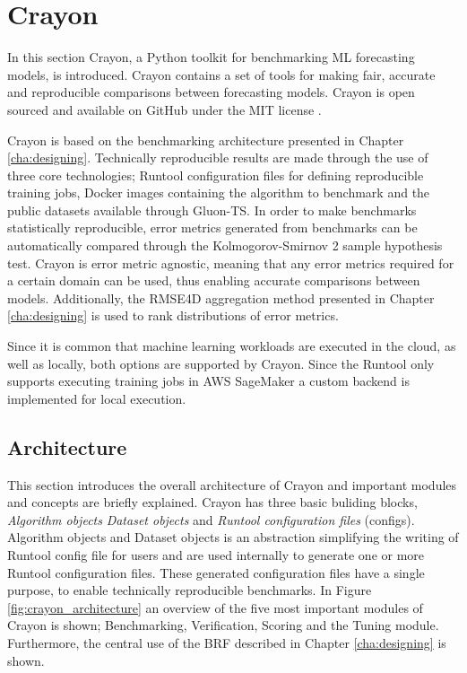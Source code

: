\chapter{Crayon}
\label{cha:crayon}

In this section Crayon, a Python toolkit for benchmarking ML forecasting models, is introduced. Crayon contains a set of tools for making fair, accurate and reproducible comparisons between forecasting models. Crayon is open sourced and available on GitHub under the MIT license \cite{crayon_github}.

Crayon is based on the benchmarking architecture presented in Chapter \ref{cha:designing}. Technically reproducible results are made through the use of three core technologies; Runtool configuration files for defining reproducible training jobs, Docker images containing the algorithm to benchmark and the public datasets available through Gluon-TS. In order to make benchmarks statistically reproducible, error metrics generated from benchmarks can be automatically compared through the Kolmogorov-Smirnov 2 sample hypothesis test. Crayon is error metric agnostic, meaning that any error metrics required for a certain domain can be used, thus enabling accurate comparisons between models. Additionally, the RMSE4D aggregation method presented in Chapter \ref{cha:designing} is used to rank distributions of error metrics.

Since it is common that machine learning workloads are executed in the cloud, as well as locally, both options are supported by Crayon. Since the Runtool only supports executing training jobs in AWS SageMaker a custom backend is implemented for local execution.

\section{Architecture}

This section introduces the overall architecture of Crayon and important modules and concepts are briefly explained.
Crayon has three basic buliding blocks, \textit{Algorithm objects} \textit{Dataset objects} and \textit{Runtool configuration files} (configs). Algorithm objects and Dataset objects is an abstraction simplifying the writing of Runtool config file for users and are used internally to generate one or more Runtool configuration files. These generated configuration files have a single purpose, to enable technically reproducible benchmarks. In Figure \ref{fig:crayon_architecture} an overview of the five most important modules of Crayon is shown; Benchmarking, Verification, Scoring and the Tuning module. Furthermore, the central use of the BRF described in Chapter \ref{cha:designing} is shown.


